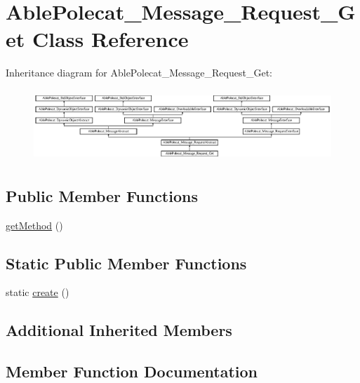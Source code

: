 \hypertarget{class_able_polecat___message___request___get}{}\section{Able\+Polecat\+\_\+\+Message\+\_\+\+Request\+\_\+\+Get Class Reference}
\label{class_able_polecat___message___request___get}
Inheritance diagram for Able\+Polecat\+\_\+\+Message\+\_\+\+Request\+\_\+\+Get\+:\begin{figure}[H]
\begin{center}
\leavevmode
\includegraphics[height=2.720648cm]{class_able_polecat___message___request___get}
\end{center}
\end{figure}
\subsection*{Public Member Functions}
\begin{DoxyCompactItemize}
\item 
\hyperlink{class_able_polecat___message___request___get_af3e37e1a6ed9b8c87f86f659873a83b7}{get\+Method} ()
\end{DoxyCompactItemize}
\subsection*{Static Public Member Functions}
\begin{DoxyCompactItemize}
\item 
static \hyperlink{class_able_polecat___message___request___get_a239b1c70258014a86569483c2d009de6}{create} ()
\end{DoxyCompactItemize}
\subsection*{Additional Inherited Members}


\subsection{Member Function Documentation}
\hypertarget{class_able_polecat___message___request___get_a239b1c70258014a86569483c2d009de6}{}

